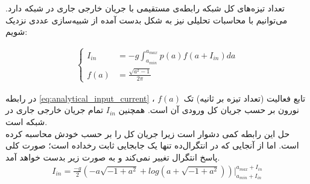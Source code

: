 \documentclass[12pt,onecolumn,a4paper]{article}
\begin{document}

تعداد تیزه‌های کل شبکه رابطه‌ی مستقیمی با جریان خارجی جاری در شبکه دارد. می‌توانیم با محاسبات تحلیلی نیز به شکل بدست آمده از شبیه‌سازی عددی نزدیک شویم:

\begin{align}
\begin{cases}
I_{in} &= -g \int_{a_{min}}^{a_{max}} p(a) f(a + I_{in}) da \\
f(a) &= \frac{\sqrt{a^2 - 1}}{2\pi}
\end{cases}
\label{eq:analytical_input_current}
\end{align}

در رابطه \ref{eq:analytical_input_current} ، $f(a)$ تابع فعالیت (تعداد تیزه بر ثانیه) تک نورون بر حسب جریان کل ورودی آن است. همچنین $I_{in}$ تمام جریان خارجی جاری در شبکه است.\\
حل این رابطه کمی دشوار است زیرا جریان کل را بر حسب خودش محاسبه کرده است. اما از آنجایی که در انتگرال‌ده تنها یک جابجایی ثابت رخداده است؛ صورت کلی پاسخ انتگرال تغییر نمی‌کند و به صورت زیر بدست خواهد آمد.
\begin{align}
I_{in} = \frac{-g}{2} (-a \sqrt{-1 + a^2} + log(a + \sqrt{-1 + a^2})) \Big|_{a_{min} + I_{in}}^{a_{max} + I_{in}}
\end{align}

\newpage


\end{document}
